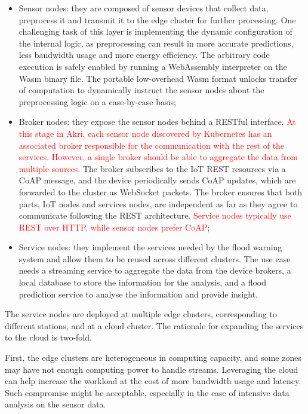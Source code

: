 \begin{itemize}
    \item Sensor nodes: they are composed of sensor devices that collect data, preprocess it and transmit it to the edge cluster for further processing. One challenging task of this layer is implementing the dynamic configuration of the internal logic, as preprocessing can result in more accurate predictions, less bandwidth usage and more energy efficiency. The arbitrary code execution is safely enabled by running a WebAssembly interpreter on the Wasm binary file. The portable low-overhead Wasm format unlocks transfer of computation to dynamically instruct the sensor nodes about the preprocessing logic on a case-by-case basis;
    \item Broker nodes: they expose the sensor nodes behind a RESTful interface. \textcolor{red}{At this stage in Akri, each sensor node discovered by Kubernetes has an associated broker responsible for the communication with the rest of the services. However, a single broker should be able to aggregate the data from multiple sources.} The broker subscribes to the IoT REST resources via a CoAP message, and the device periodically sends CoAP updates, which are forwarded to the cluster as WebSocket packets. The broker ensures that both parts, IoT nodes and services nodes, are independent as far as they agree to communicate following the REST architecture. \textcolor{red}{Service nodes typically use REST over HTTP, while sensor nodes prefer CoAP};
    \item Service nodes: they implement the services needed by the flood warning system and allow them to be reused across different clusters. The use case needs a streaming service to aggregate the data from the device brokers, a local database to store the information for the analysis, and a flood prediction service to analyse the information and provide insight. 
\end{itemize}

The service nodes are deployed at multiple edge clusters, corresponding to different stations, and at a cloud cluster. The rationale for expanding the services to the cloud is two-fold.

First, the edge clusters are heterogeneous in computing capacity, and some zones may have not enough computing power to handle streams. Leveraging the cloud can help increase the workload at the cost of more bandwidth usage and latency. Such compromise might be acceptable, especially in the case of intensive data analysis on the sensor data.


